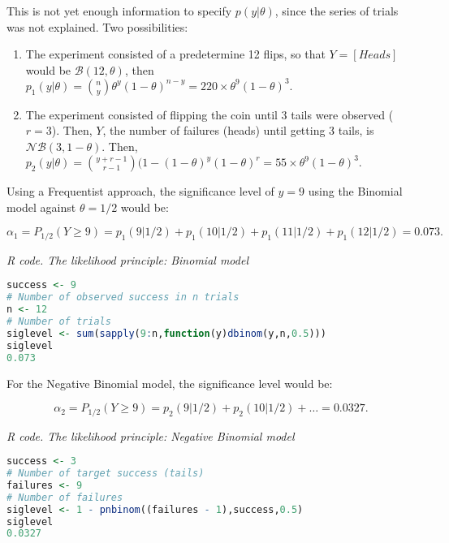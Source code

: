 This is not yet enough information to specify $p(y|\theta)$, since the series of trials was not explained. Two possibilities:

\begin{enumerate}
	\item The experiment consisted of a predetermine 12 flips, so that $Y=\left[Heads\right]$ would be $\mathcal{B}(12,\theta)$, then $p_1(y|\theta)={\binom{{n}}{{y}}}\theta^y(1-\theta)^{n-y}=220\times\theta^9(1-\theta)^{3}.$
	\item The experiment consisted of flipping the coin until 3 tails were observed ($r=3$). Then, $Y$, the number of failures (heads) until getting 3 tails, is $\mathcal{N}\mathcal{B}(3,1-\theta)$. Then, $p_2(y|\theta)={\binom{{y+r-1}}{{r-1}}}(1-(1-\theta)^y(1-\theta)^{r}=55\times\theta^9(1-\theta)^{3}.$  
\end{enumerate}

Using a Frequentist approach, the significance level of $y=9$ using the Binomial model against $\theta=1/2$ would be:

\begin{equation*}
	\alpha_1=P_{1/2}(Y\geq
	9)=p_1(9|1/2)+p_1(10|1/2)+p_1(11|1/2)+p_1(12|1/2)=0.073.
\end{equation*}

\begin{tcolorbox}[enhanced,width=4.67in,center upper,
	fontupper=\large\bfseries,drop shadow southwest,sharp corners]
	\textit{R code. The likelihood principle: Binomial model}
\begin{VF}
\begin{lstlisting}[basicstyle=\footnotesize, language=R]
success <- 9 
# Number of observed success in n trials
n <- 12 
# Number of trials
siglevel <- sum(sapply(9:n,function(y)dbinom(y,n,0.5)))
siglevel
0.073
\end{lstlisting}
\end{VF}
\end{tcolorbox}

For the Negative Binomial model, the significance level would be:

\begin{equation*}
	\alpha_2=P_{1/2}(Y\geq 9)=p_2(9|1/2)+p_2(10|1/2)+\ldots=0.0327.
\end{equation*}

\begin{tcolorbox}[enhanced,width=4.67in,center upper,
	fontupper=\large\bfseries,drop shadow southwest,sharp corners]
	\textit{R code. The likelihood principle: Negative Binomial model}
\begin{VF}
\begin{lstlisting}[basicstyle=\footnotesize, language=R]
success <- 3 
# Number of target success (tails)
failures <- 9 
# Number of failures
siglevel <- 1 - pnbinom((failures - 1),success,0.5)
siglevel
0.0327
\end{lstlisting}
\end{VF}
\end{tcolorbox}

